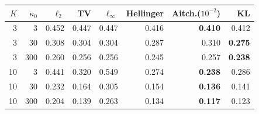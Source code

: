 \begin{tabular}{rrrrrrrr}
\toprule
$K$ & $\kappa_0$ & $\ell_2$ & TV & $\ell_\infty$ & Hellinger & Aitch.($10^{-2}$) & KL \\
\midrule
3 & 3 & 0.452 & 0.447 & 0.447 & 0.416 & \textbf{0.410} & 0.412 \\
3 & 30 & 0.308 & 0.304 & 0.304 & 0.287 & 0.310 & \textbf{0.275} \\
3 & 300 & 0.260 & 0.256 & 0.256 & 0.245 & 0.257 & \textbf{0.238} \\
10 & 3 & 0.441 & 0.320 & 0.549 & 0.274 & \textbf{0.238} & 0.286 \\
10 & 30 & 0.232 & 0.164 & 0.305 & 0.154 & \textbf{0.136} & 0.141 \\
10 & 300 & 0.204 & 0.139 & 0.263 & 0.134 & \textbf{0.117} & 0.123 \\
\bottomrule
\end{tabular}
